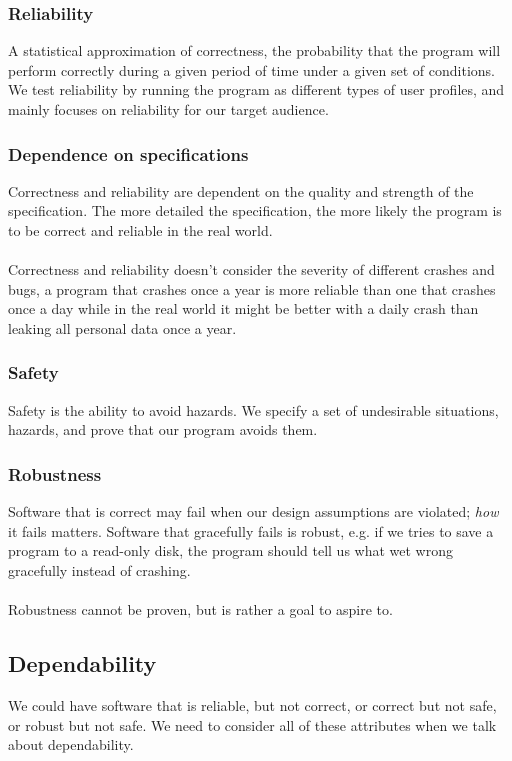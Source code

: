 \subsubsection{Reliability}
A statistical approximation of correctness, the probability that the program will perform correctly during a given period of time under a given set of conditions. We test reliability by running the program as different types of user profiles, and mainly focuses on reliability for our target audience.

\subsubsection{Dependence on specifications}
Correctness and reliability are dependent on the quality and strength of the specification. The more detailed the specification, the more likely the program is to be correct and reliable in the real world.\\
\\
Correctness and reliability doesn't consider the severity of different crashes and bugs, a program that crashes once a year is more reliable than one that crashes once a day while in the real world it might be better with a daily crash than leaking all personal data once a year.\\

\subsubsection{Safety}
Safety is the ability to avoid hazards. We specify a set of undesirable situations, hazards, and prove that our program avoids them.\\

\subsubsection{Robustness}
Software that is correct may fail when our design assumptions are violated; \textit{how} it fails matters. Software that gracefully fails is robust, e.g. if we tries to save a program to a read-only disk, the program should tell us what wet wrong gracefully instead of crashing.\\
\\
Robustness cannot be proven, but is rather a goal to aspire to.

\subsection{Dependability}
We could have software that is reliable, but not correct, or correct but not safe, or robust but not safe. We need to consider all of these attributes when we talk about dependability.\\
